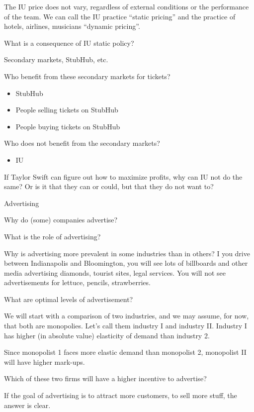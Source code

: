 \documentclass[
]{book}
\providecommand{\tightlist}{%
  \setlength{\itemsep}{0pt}\setlength{\parskip}{0pt}}
\begin{document}
The IU price does not vary, regardless of external conditions or the performance of the team. We can call the IU practice ``static pricing'' and the practice of hotels, airlines, musicians ``dynamic pricing''.

What is a consequence of IU static policy?

Secondary markets, StubHub, etc.

Who benefit from these secondary markets for tickets?

\begin{itemize}
\tightlist
\item
  StubHub
\item
  People selling tickets on StubHub
\item
  People buying tickets on StubHub
\end{itemize}

Who does not benefit from the secondary markets?

\begin{itemize}
\tightlist
\item
  IU
\end{itemize}

If Taylor Swift can figure out how to maximize profits, why can IU not do the same? Or is it that they can or could, but that they do not want to?

Advertising

Why do (some) companies advertise?

What is the role of advertising?

Why is advertising more prevalent in some industries than in others? I you drive between Indianapolis and Bloomington, you will see lots of billboards and other media advertising diamonds, tourist sites, legal services. You will not see advertisements for lettuce, pencils, strawberries.

What are optimal levels of advertisement?

We will start with a comparison of two industries, and we may assume, for now, that both are monopolies. Let's call them industry I and industry II. Industry I has higher (in absolute value) elasticity of demand than industry 2.

Since monopolist 1 faces more elastic demand than monopolist 2, monopolist II will have higher mark-ups.

Which of these two firms will have a higher incentive to advertise?

If the goal of advertising is to attract more customers, to sell more stuff, the answer is clear.
\end{document}
